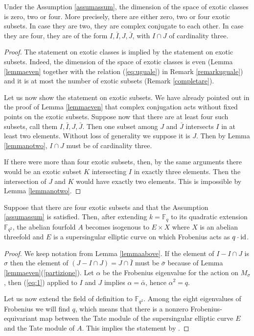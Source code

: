 \begin{lemma}
\notready\label{lemmaabove}
Under the Assumption \ref{assumassum}, the dimension of the space of exotic classes is zero, two or four. More precisely, there are either  zero, two or four exotic subsets. In case they are two, they are  complex conjugate to each other. In case they are four, they are of the form $I,\bar{I}, J, \bar{J}$, with $I\cap J$ of cardinality three.
 \end{lemma}
\begin{proof}
The statement on exotic classes is implied by the statement on exotic subsets. Indeed, the dimension of the space of exotic classes is even (Lemma \ref{lemmaeven} together with the relation (\ref{eq:uguale}) in Remark \ref{remarkuguale}) and it is  at most the number of exotic subsets (Remark \ref{completare}).


Let us now show the statement on exotic subsets. We have already pointed out in the proof of Lemma \ref{lemmaeven} that  complex conjugation acts without fixed points on the exotic subsets. Suppose now that there are at least four such subsets, call them $I,\bar{I}, J, \bar{J}$. Then one subset among $J$ and $\bar{J}$ intersects $I$ in at least two elements. Without loss of generality we suppose it is $J$. Then by Lemma \ref{lemmanotwo}, $I\cap J$ must be of cardinality three.

If there were more than four exotic subsets, then, by the same arguments there would be an exotic subset $K$ intersecting $I$ in exactly three elements. Then the intersection of $J$ and $K$ would have exactly two elements. This is impossible  by Lemma \ref{lemmanotwo}.
\end{proof}

\begin{lemma}
\notready\label{lemmafour}
Suppose that there are four exotic subsets and that the Assumption   \ref{assumassum} is satisfied. Then, after extending $k= \mathbb{F}_{q}$ to its quadratic extension $\mathbb{F}_{q^2}$, the abelian fourfold $A$ becomes isogenous to  $E\times X$ where  $X$ is an abelian threefold and $E$ is a supersingular elliptic curve on which   Frobenius acts as $q\cdot \mathrm{id} $.


\end{lemma}

\begin{proof}
We keep notation from Lemma \ref{lemmaabove}. If the element of $I-I\cap J$ is $\sigma$ then the element of  $(J-I\cap J)= J \cap \bar{I}$ must be $\bar{\sigma}$ because of  Lemma \ref{lemmaeven}(\ref{partizione}).  Let $\alpha$ be the Frobenius eigenvalue for the action on $M_\sigma$, then  (\ref{eq:1}) applied to $I$ and $J$ implies $\alpha=\bar{\alpha}$, hence $\alpha^2=q$.

Let us now extend the field of definition to $\mathbb{F}_{q^2}$. Among the eight eigenvalues of  Frobenius we will find $q$, which means that there is a nonzero Frobenius-equivariant map between the Tate module of the supersingular elliptic curve $E$ and the Tate module of $A$. This implies the statement by  \cite[Theorem 4]{Tate}.
\end{proof}


